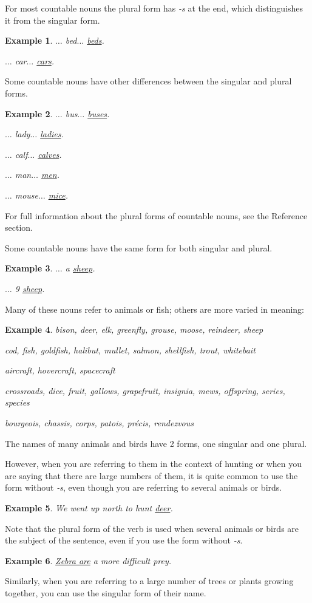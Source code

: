 \documentclass[oneside]{book}
\numberwithin{equation}{section}
\newtheorem{example}{Example}[section]
\begin{document}
%
\noindent{} For most countable nouns the plural form has \textit{-s} at the end, which distinguishes it from the singular form.
\begin{example}
    $\ldots$ bed$\ldots$ \underline{beds}.
    
    $\ldots$ car$\ldots$ \underline{cars}.
\end{example}
Some countable nouns have other differences between the singular and plural forms.
\begin{example}
    $\ldots$ bus$\ldots$ \underline{buses}.
    
    $\ldots$ lady$\ldots$ \underline{ladies}.
    
    $\ldots$ calf$\ldots$ \underline{calves}.
    
    $\ldots$ man$\ldots$ \underline{men}.
    
    $\ldots$ mouse$\ldots$ \underline{mice}.
\end{example}
For full information about the plural forms of countable nouns, see the Reference section.

%
\noindent{} Some countable nouns have the same form for both singular and plural.
\begin{example}
    $\ldots$ a \underline{sheep}.
    
    $\ldots$ 9 \underline{sheep}.
\end{example}
Many of these nouns refer to animals or fish; others are more varied in meaning:
\begin{example}
    bison, deer, elk, greenfly, grouse, moose, reindeer, sheep
    
    cod, fish, goldfish, halibut, mullet, salmon, shellfish, trout, whitebait
    
    aircraft, hovercraft, spacecraft
    
    crossroads, dice, fruit, gallows, grapefruit, insignia, mews, offspring, series, species
    
    bourgeois, chassis, corps, patois, pr\'ecis, rendezvous
\end{example}
%
\noindent{} The names of many animals and birds have 2 forms, one singular and one plural.

However, when you are referring to them in the context of hunting or when you are saying that there are large numbers of them, it is quite common to use the form without \textit{-s}, even though you are referring to several animals or birds.
\begin{example}
    We went up north to hunt \underline{deer}.
\end{example}
Note that the plural form of the verb is used when several animals or birds are the subject of the sentence, even if you use the form without \textit{-s}.
\begin{example}
    \underline{Zebra are} a more difficult prey.
\end{example}
Similarly, when you are referring to a large number of trees or plants growing together, you can use the singular form of their name.
\end{document}
